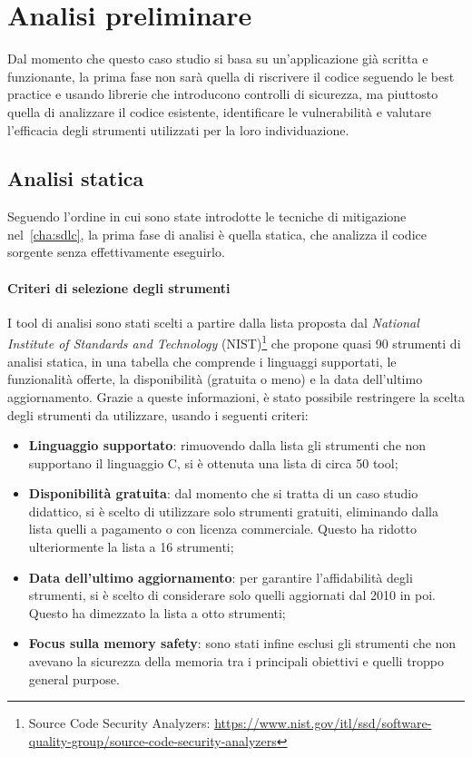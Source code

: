 \section{Analisi preliminare}
\label{sec:initial_analysis}

Dal momento che questo caso studio si basa su un'applicazione già scritta e funzionante,
la prima fase non sarà quella di riscrivere il codice seguendo le best practice
e usando librerie che introducono controlli di sicurezza, ma piuttosto quella di
analizzare il codice esistente, identificare le vulnerabilità e valutare l'efficacia
degli strumenti utilizzati per la loro individuazione.

\subsection*{Analisi statica}
Seguendo l'ordine in cui sono state introdotte le tecniche di mitigazione nel~\autoref{cha:sdlc},
la prima fase di analisi è quella statica, che analizza il codice sorgente senza
effettivamente eseguirlo.

\paragraph{Criteri di selezione degli strumenti}
I tool di analisi sono stati scelti a partire dalla lista proposta dal \textit{National
Institute of Standards and Technology} (NIST)\footnote{Source Code Security
Analyzers: \url{https://www.nist.gov/itl/ssd/software-quality-group/source-code-security-analyzers}}
che propone quasi 90 strumenti di analisi statica, in una tabella che comprende
i linguaggi supportati, le funzionalità offerte, la disponibilità (gratuita o meno)
e la data dell'ultimo aggiornamento. Grazie a queste informazioni, è stato
possibile restringere la scelta degli strumenti da utilizzare, usando i seguenti
criteri:
\begin{itemize}
  \item \textbf{Linguaggio supportato}: rimuovendo dalla lista gli strumenti che
    non supportano il linguaggio C, si è ottenuta una lista di circa 50 tool;

  \item \textbf{Disponibilità gratuita}: dal momento che si tratta di un caso studio
    didattico, si è scelto di utilizzare solo strumenti gratuiti, eliminando dalla
    lista quelli a pagamento o con licenza commerciale. Questo ha ridotto
    ulteriormente la lista a 16 strumenti;

  \item \textbf{Data dell'ultimo aggiornamento}: per garantire l'affidabilità degli
    strumenti, si è scelto di considerare solo quelli aggiornati dal 2010 in poi.
    Questo ha dimezzato la lista a otto strumenti;

  \item \textbf{Focus sulla memory safety}: sono stati infine esclusi gli strumenti
    che non avevano la sicurezza della memoria tra i principali obiettivi e quelli
    troppo general purpose.
\end{itemize}

